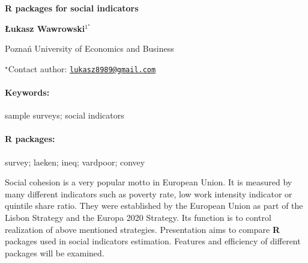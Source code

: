 \documentclass[11pt, a4paper]{article}
\renewcommand{\title}[1]{\begin{center}{\bf \LARGE #1}\end{center}}
\newcommand{\keywords}{\paragraph{Keywords:}}
\newcommand{\packages}{\paragraph{R packages:}}
\begin{document}
\pagestyle{empty}

\title{R packages for social indicators}

\begin{center}
  {\bf Łukasz Wawrowski$^{1^\star}$}
\end{center}

\vskip 0.3cm

\begin{affiliations}
\begin{enumerate}
\begin{minipage}{0.915\textwidth}
\centering
\item Poznań University of Economics and Business \\[-2pt]
\end{minipage}
\end{enumerate}
$^\star$Contact author: \href{mailto:lukasz8989@gmail.com}{\nolinkurl{lukasz8989@gmail.com}}\\
\end{affiliations}

\vskip 0.5cm

\begin{minipage}{0.915\textwidth}
\keywords sample surveys; social indicators
\packages survey; laeken; ineq; vardpoor; convey
\end{minipage}

\vskip 0.8cm

Social cohesion is a very popular motto in European Union. It is
measured by many different indicators such as poverty rate, low work
intensity indicator or quintile share ratio. They were established by
the European Union as part of the Lisbon Strategy and the Europa 2020
Strategy. Its function is to control realization of above mentioned
strategies. Presentation aims to compare \textbf{R} packages used in
social indicators estimation. Features and efficiency of different
packages will be examined.
\end{document}
